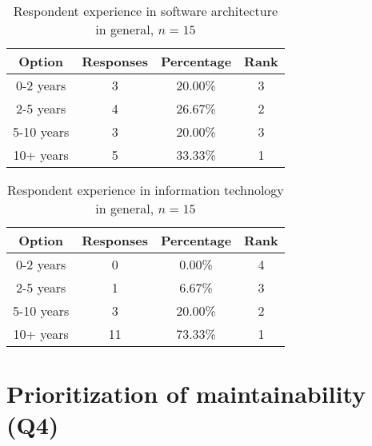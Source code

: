 \documentclass[utf8,english]{gradu3}
\begin{document}
\begin{table}[!h]
  \begin{center}
    \caption{Respondent experience in software architecture in general, $n = 15$}
    \label{table:experience-architecture}
    \begin{tabular}{|c|c|c|c|}
      \hline
      \textbf{Option} & \textbf{Responses} & \textbf{Percentage} & \textbf{Rank} \\
      \hline
      0-2 years       & 3                  & 20.00\%             & 3             \\
      2-5 years       & 4                  & 26.67\%             & 2             \\
      5-10 years      & 3                  & 20.00\%             & 3             \\
      10+ years       & 5                  & 33.33\%             & 1             \\
      \hline
    \end{tabular}
  \end{center}
\end{table}

\begin{table}[!h]
  \begin{center}
    \caption{Respondent experience in information technology in general, $n = 15$}
    \label{table:experience-it}
    \begin{tabular}{|c|c|c|c|}
      \hline
      \textbf{Option} & \textbf{Responses} & \textbf{Percentage} & \textbf{Rank} \\
      \hline
      0-2 years       & 0                  & 0.00\%              & 4             \\
      2-5 years       & 1                  & 6.67\%              & 3             \\
      5-10 years      & 3                  & 20.00\%             & 2             \\
      10+ years       & 11                 & 73.33\%             & 1             \\
      \hline
    \end{tabular}
  \end{center}
\end{table}

\section{Prioritization of maintainability (Q4)}
\end{document}
